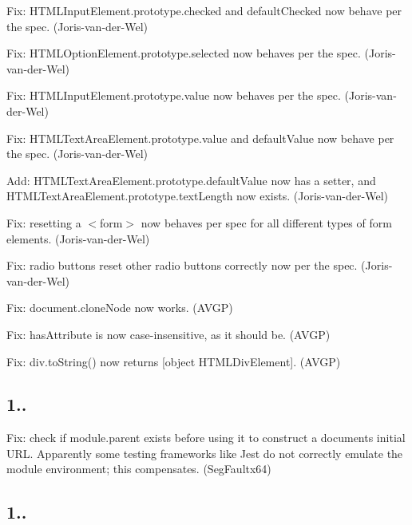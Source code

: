 \begin{DoxyItemize}
\item Fix\+: {\ttfamily H\+T\+M\+L\+Input\+Element.\+prototype.\+checked} and {\ttfamily default\+Checked} now behave per the spec. (Joris-\/van-\/der-\/\+Wel)
\item Fix\+: {\ttfamily H\+T\+M\+L\+Option\+Element.\+prototype.\+selected} now behaves per the spec. (Joris-\/van-\/der-\/\+Wel)
\item Fix\+: {\ttfamily H\+T\+M\+L\+Input\+Element.\+prototype.\+value} now behaves per the spec. (Joris-\/van-\/der-\/\+Wel)
\item Fix\+: {\ttfamily H\+T\+M\+L\+Text\+Area\+Element.\+prototype.\+value} and {\ttfamily default\+Value} now behave per the spec. (Joris-\/van-\/der-\/\+Wel)
\item Add\+: {\ttfamily H\+T\+M\+L\+Text\+Area\+Element.\+prototype.\+default\+Value} now has a setter, and {\ttfamily H\+T\+M\+L\+Text\+Area\+Element.\+prototype.\+text\+Length} now exists. (Joris-\/van-\/der-\/\+Wel)
\item Fix\+: resetting a {\ttfamily $<$form$>$} now behaves per spec for all different types of form elements. (Joris-\/van-\/der-\/\+Wel)
\item Fix\+: radio buttons reset other radio buttons correctly now per the spec. (Joris-\/van-\/der-\/\+Wel)
\item Fix\+: {\ttfamily document.\+clone\+Node} now works. (A\+V\+GP)
\item Fix\+: {\ttfamily has\+Attribute} is now case-\/insensitive, as it should be. (A\+V\+GP)
\item Fix\+: {\ttfamily div.\+to\+String()} now returns {\ttfamily \mbox{[}object H\+T\+M\+L\+Div\+Element\mbox{]}}. (A\+V\+GP)
\end{DoxyItemize}

\subsection*{1..}


\begin{DoxyItemize}
\item Fix\+: check if {\ttfamily module.\+parent} exists before using it to construct a document\textquotesingle{}s initial U\+RL. Apparently some testing frameworks like Jest do not correctly emulate the module environment; this compensates. (Seg\+Faultx64)
\end{DoxyItemize}

\subsection*{1..}



